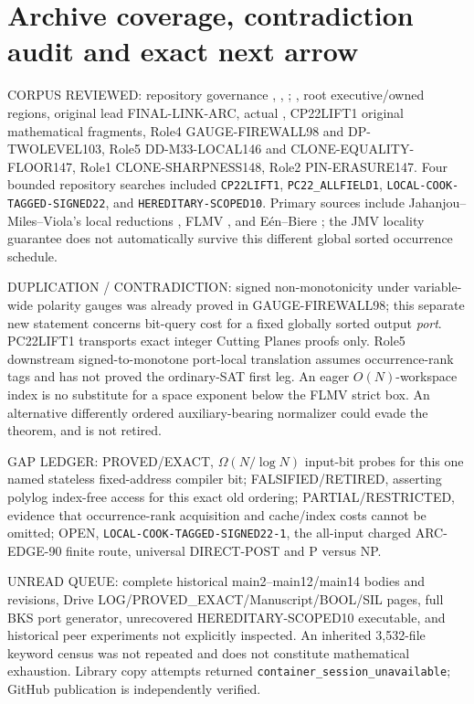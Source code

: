 \documentclass[11pt]{article}
\begin{document}
\section{Archive coverage, contradiction audit and exact next arrow}
CORPUS REVIEWED: repository governance , , ; , root  executive/owned regions, original lead FINAL-LINK-ARC, actual , CP22LIFT1 original mathematical fragments, Role4 GAUGE-FIREWALL98 and DP-TWOLEVEL103, Role5 DD-M33-LOCAL146 and CLONE-EQUALITY-FLOOR147, Role1 CLONE-SHARPNESS148, Role2 PIN-ERASURE147. Four bounded repository searches included \texttt{CP22LIFT1}, \texttt{PC22\_ALLFIELD1}, \texttt{LOCAL-COOK-TAGGED-SIGNED22}, and \texttt{HEREDITARY-SCOPED10}. Primary sources include Jahanjou--Miles--Viola's local reductions \cite{jmv}, FLMV \cite{flmv}, and E\'en--Biere \cite{een}; the JMV locality guarantee does not automatically survive this different global sorted occurrence schedule.

DUPLICATION / CONTRADICTION: signed non-monotonicity under variable-wide polarity gauges was already proved in GAUGE-FIREWALL98; this separate new statement concerns bit-query cost for a fixed globally sorted output \emph{port}. PC22LIFT1 transports exact integer Cutting Planes proofs only. Role5 downstream signed-to-monotone port-local translation assumes occurrence-rank tags and has not proved the ordinary-SAT first leg. An eager \(O(N)\)-workspace index is no substitute for a space exponent below the FLMV strict box. An alternative differently ordered auxiliary-bearing normalizer could evade the theorem, and is not retired.

GAP LEDGER: PROVED/EXACT, \(\Omega(N/\log N)\) input-bit probes for this one named stateless fixed-address compiler bit; FALSIFIED/RETIRED, asserting polylog index-free access for this exact old ordering; PARTIAL/RESTRICTED, evidence that occurrence-rank acquisition and cache/index costs cannot be omitted; OPEN, \texttt{LOCAL-COOK-TAGGED-SIGNED22-1}, the all-input charged ARC-EDGE-90 finite route, universal DIRECT-POST and P versus NP.

UNREAD QUEUE: complete historical main2--main12/main14 bodies and revisions, Drive LOG/PROVED\_EXACT/Manuscript/BOOL/SIL pages, full BKS port generator, unrecovered HEREDITARY-SCOPED10 executable, and historical peer experiments not explicitly inspected. An inherited 3,532-file keyword census was not repeated and does not constitute mathematical exhaustion. Library copy attempts returned \texttt{container\_session\_unavailable}; GitHub publication is independently verified.
\end{document}

